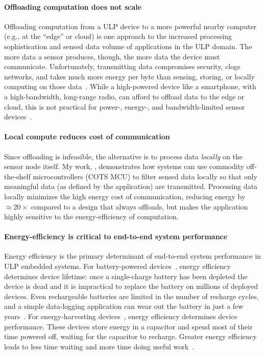 \paragraph{Offloading computation does not scale}
Offloading computation from a ULP device to a more powerful nearby computer (e.g., at the ``edge'' or cloud) is one approach to the increased processing sophistication and sensed data volume of applications in the ULP domain.
%
The more data a sensor produces, though, the more data the device must
communicate.
%
Unfortunately, transmitting data compromises security, clogs networks, and takes much more energy per byte than
sensing, storing, or locally computing on those data~\cite{sonic,zebranet}.  
%
While a high-powered device like a smartphone, with a high-bandwidth,
long-range radio, can afford to offload data to the edge or cloud,
this is not practical for power-, energy-, and bandwidth-limited sensor devices~\cite{dongare2017openchirp,sonic}.

\paragraph{Local compute reduces cost of communication}
Since offloading is infeasible,
the alternative is to process data \emph{locally} on the sensor node itself.
% 
My work, \sonic, demonstrates how systems can use commodity off-the-shelf microcontrollers (COTS MCU) to filter sensed data locally so that only meaningful data (as defined by the application) are transmitted.
% 
Processing data locally minimizes the high energy cost of communication, reducing energy by $\approx20\times$ compared to a design that always offloads, but makes the application highly sensitive to the energy-efficiency of computation.

\paragraph{Energy-efficiency is critical to end-to-end system performance}
Energy efficiency is the primary determinant of end-to-end system performance in ULP embedded systems.
% 
For battery-powered devices~\cite{culler2002mica,rowe2011sensor}, energy efficiency determines device lifetime: once a single-charge battery has been depleted the device is dead and it is impractical to replace the battery on millions of deployed devices.
% 
Even rechargeable batteries are limited in the number of recharge cycles, and a simple data-logging application can wear out the battery in just a few years~\cite{jackson_2019,nardello2019camaroptera}.
% 
For energy-harvesting devices~\cite{colin2018reconfigurable,hester2015tragedy,flicker,moo,windware}, energy efficiency determines device performance.
% 
These devices store energy in a capacitor and spend most of their time powered off, waiting for the capacitor to recharge.
% 
Greater energy efficiency leads to less time waiting and more time doing useful work~\cite{desai2020power}.

